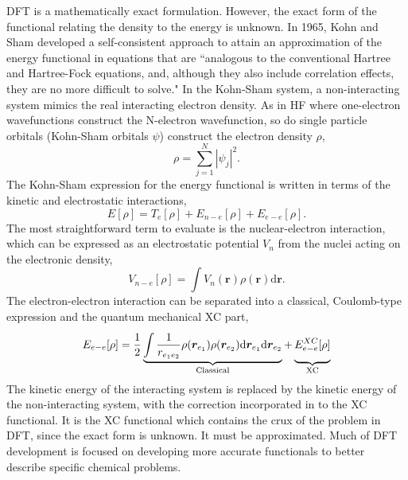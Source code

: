 \ac{DFT} is a mathematically exact formulation. However, the exact form of the functional relating the density to the energy is unknown. In 1965, Kohn and Sham developed a self-consistent approach to attain an approximation of the energy functional in equations that are ``analogous to the conventional Hartree and Hartree-Fock equations, and, although they also include correlation effects, they are no more difficult to solve."\cite{Kohn1965} In the Kohn-Sham system, a non-interacting system mimics the real interacting electron density. As in \ac{HF} where one-electron wavefunctions construct the N-electron wavefunction, so do single particle orbitals (Kohn-Sham orbitals $\psi$) construct the electron density $\rho$,\cite{Ullrich2012}
\begin{equation}
    \rho=\sum_{j=1}^{N}|\psi_{j}|^{2}.
\end{equation}
The Kohn-Sham expression for the energy functional is written in terms of the kinetic and electrostatic interactions,
\begin{equation}
    E[\rho]=T_{e}[\rho]+E_{n-e}[\rho]+E_{e-e}[\rho].
\end{equation}
The most straightforward term to evaluate is the nuclear-electron interaction, which can be expressed as an electrostatic potential $V_{n}$ from the nuclei acting on the electronic density, 
\begin{equation}
    V_{n-e}[\rho]=\int{V_{n}(\bm{r})\rho(\bm{r})\mathrm{d}\bm{r}}.
\end{equation}
The electron-electron interaction can be separated into a classical, Coulomb-type expression and the quantum mechanical \ac{XC} part,\cite{Ullrich2012}
\begin{equation}
    E_{e-e}[\rho]=\frac{1}{2}\underbrace{\int{}\frac{1}{r_{e_{1}e_{2}}}\rho(\bm{r}_{e_{1}})\rho(\bm{r}_{e_{2}})\mathrm{d}\bm{r}_{e_{1}}\mathrm{d}\bm{r}_{e_{2}}}_\text{Classical}+\underbrace{\vphantom{ \left(\frac{a^{0.3}}{b}\right) }E_{e-e}^{XC}[\rho]}_\text{XC}
\end{equation}
The kinetic energy of the interacting system is replaced by the kinetic energy of the non-interacting system, with the correction incorporated in to the \ac{XC} functional. It is the \ac{XC} functional which contains the crux of the problem in \ac{DFT}, since the exact form is unknown. It must be approximated. Much of \ac{DFT} development is focused on developing more accurate functionals to better describe specific chemical problems.

